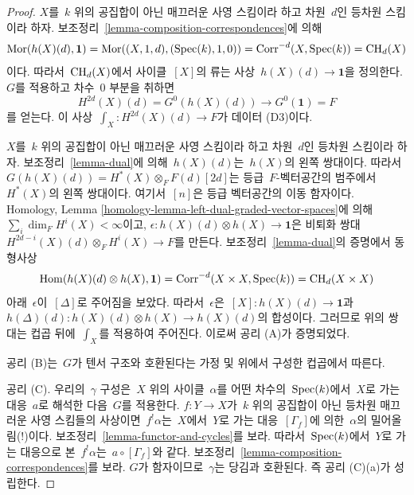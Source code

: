 \begin{proof}
\medskip\noindent
$X$를\  $k$ 위의 공집합이 아닌 매끄러운 사영 스킴이라 하고 차원\ 
$d$인 등차원 스킴이라 하자. 보조정리\ 
\ref{lemma-composition-correspondences}에 의해
$$
\mathop{\mathrm{Mor}}\nolimits(h(X)(d), \mathbf{1}) = \mathop{\mathrm{Mor}}\nolimits((X, 1, d), (\mathop{\mathrm{Spec}}(k), 1, 0)) =
\text{Corr}^{-d}(X, \mathop{\mathrm{Spec}}(k)) = \mathop{\mathrm{CH}}\nolimits_d(X)
$$
이다. 따라서\  $\mathop{\mathrm{CH}}\nolimits_d(X)$에서 사이클\  $[X]$의 류는 사상\ 
$h(X)(d) \to \mathbf{1}$을 정의한다. $G$를 적용하고 차수\  $0$ 부분을
취하면
$$
H^{2d}(X)(d) = G^0(h(X)(d)) \longrightarrow G^0(\mathbf{1}) = F
$$
를 얻는다. 이 사상\  $\int_X : H^{2d}(X)(d) \to F$가 데이터 (D3)이다.

\medskip\noindent
$X$를\  $k$ 위의 공집합이 아닌 매끄러운 사영 스킴이라 하고 차원\ 
$d$인 등차원 스킴이라 하자. 보조정리\  \ref{lemma-dual}에 의해\ 
$h(X)(d)$는\  $h(X)$의 왼쪽 쌍대이다. 따라서\ 
$G(h(X)(d)) = H^*(X) \otimes_F F(d)[2d]$는 등급\  $F$-벡터공간의
범주에서\  $H^*(X)$의 왼쪽 쌍대이다. 여기서\  $[n]$은 등급 벡터공간의
이동 함자이다. Homology, Lemma
\ref{homology-lemma-left-dual-graded-vector-spaces}에 의해\ 
$\sum_i \dim_F H^i(X) < \infty$이고,
$\epsilon : h(X)(d) \otimes h(X) \to \mathbf{1}$은 비퇴화 쌍대\ 
$H^{2d - i}(X)(d) \otimes_F H^i(X) \to F$를 만든다. 보조정리\ 
\ref{lemma-dual}의 증명에서 동형사상
$$
\mathop{\mathrm{Hom}}\nolimits(h(X)(d) \otimes h(X), \mathbf{1}) =
\text{Corr}^{-d}(X \times X, \mathop{\mathrm{Spec}}(k)) =
\mathop{\mathrm{CH}}\nolimits_d(X \times X)
$$
아래\  $\epsilon$이\  $[\Delta]$로 주어짐을 보았다. 따라서\  $\epsilon$은\ 
$[X] : h(X)(d) \to \mathbf{1}$과\ 
$h(\Delta)(d) : h(X)(d) \otimes h(X) \to h(X)(d)$의 합성이다.
그러므로 위의 쌍대는 컵곱 뒤에\  $\int_X$를 적용하여 주어진다.
이로써 공리 (A)가 증명되었다.

\medskip\noindent
공리 (B)는\  $G$가 텐서 구조와 호환된다는 가정 및 위에서 구성한
컵곱에서 따른다.

\medskip\noindent
공리 (C). 우리의\  $\gamma$ 구성은\  $X$ 위의 사이클\  $\alpha$를 어떤
차수의\  $\mathop{\mathrm{Spec}}(k)$에서\  $X$로 가는 대응\  $a$로 해석한 다음\  $G$를
적용한다. $f : Y \to X$가\  $k$ 위의 공집합이 아닌 등차원 매끄러운
사영 스킴들의 사상이면\  $f^!\alpha$는\  $X$에서\  $Y$로 가는 대응\ 
$[\Gamma_f]$에 의한\  $\alpha$의 밀어올림(!)이다. 보조정리\ 
\ref{lemma-functor-and-cycles}를 보라. 따라서\  $\mathop{\mathrm{Spec}}(k)$에서\  $Y$로
가는 대응으로 본\  $f^!\alpha$는\  $a \circ [\Gamma_f]$와 같다.
보조정리\  \ref{lemma-composition-correspondences}를 보라. $G$가
함자이므로\  $\gamma$는 당김과 호환된다. 즉 공리 (C)(a)가 성립한다.


\end{proof}
